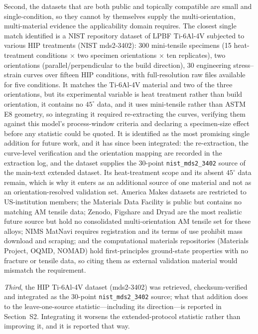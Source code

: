 \documentclass[12pt,a4paper,twocolumn]{article}
\providecommand{\ang}[1]{\ensuremath{#1^{\circ}}}
\begin{document}
Second, the datasets that are both public and topically compatible are small and single-condition, so they
cannot by themselves supply the multi-orientation, multi-material evidence the applicability domain
requires. The closest single match identified is a NIST repository dataset of LPBF Ti-6Al-4V subjected to
various HIP treatments (NIST mds2-3402): 300 mini-tensile specimens (15 heat-treatment conditions $\times$ two specimen orientations $\times$ ten replicates), two orientations
(parallel/perpendicular to the build direction), 30 engineering stress--strain curves over fifteen HIP
conditions, with full-resolution raw files available for five conditions. It matches the Ti-6Al-4V
material and two of the three orientations, but its experimental variable is heat treatment rather than
build orientation, it contains no $\ang{45}$ data, and it uses mini-tensile rather than ASTM E8 geometry,
so integrating it required re-extracting the curves, verifying them against this model's
process-window criteria and declaring a specimen-size effect before any statistic could be quoted. It is
identified as the most promising single addition for future work, and it has since been integrated: the re-extraction, the curve-level verification and the orientation mapping are recorded in the extraction log, and the dataset supplies the 30-point \texttt{nist\_mds2\_3402} source of the main-text extended dataset. Its heat-treatment scope and its absent $\ang{45}$ data remain, which is why it enters as an additional source of one material and not as an orientation-resolved validation set. America
Makes datasets are restricted to US-institution members; the Materials Data Facility is public but
contains no matching AM tensile data; Zenodo, Figshare and Dryad are the most realistic future source but
hold no consolidated multi-orientation AM tensile set for these alloys; NIMS MatNavi requires registration
and its terms of use prohibit mass download and scraping; and the computational materials repositories
(Materials Project, OQMD, NOMAD) hold first-principles ground-state properties with no fracture or tensile
data, so citing them as external validation material would mismatch the requirement.

\emph{Third}, the HIP Ti-6Al-4V dataset (mds2-3402) was retrieved, checksum-verified and integrated as the 30-point \texttt{nist\_mds2\_3402} source; what that addition does to the leave-one-source statistic---including its direction---is reported in Section~S2. Integrating it worsens the extended-protocol statistic rather than improving it, and it is reported that way.
\end{document}
